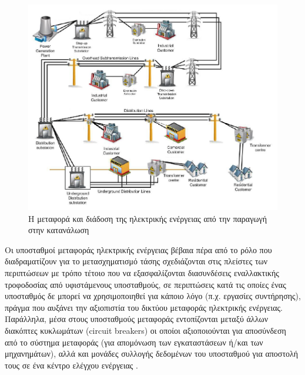 \documentclass[12pt, a4paper, oneside]{report}
\begin{document}
\begin{figure}[!h]
\centering
\includegraphics[scale=0.496]{eikona_00}
\caption[Η μεταφορά και διάδοση της ηλεκτρικής ενέργειας από την παραγωγή στην κατανάλωση]{Η μεταφορά και διάδοση της ηλεκτρικής ενέργειας από την παραγωγή στην κατανάλωση\cite{6}}\label{eik0}
\end{figure}

Οι υποσταθμοί μεταφοράς ηλεκτρικής ενέργειας βέβαια πέρα από το ρόλο που διαδραματίζουν για το μετασχηματισμό τάσης σχεδιάζονται στις πλείστες των περιπτώσεων με τρόπο τέτοιο που να εξασφαλίζονται διασυνδέσεις εναλλακτικής τροφοδοσίας από υφιστάμενους υποσταθμούς, σε περιπτώσεις κατά τις οποίες ένας υποσταθμός δε μπορεί να χρησιμοποιηθεί για κάποιο λόγο (π.χ. εργασίες συντήρησης), πράγμα που αυξάνει την αξιοπιστία του δικτύου μεταφοράς ηλεκτρικής ενέργειας. Παράλληλα, μέσα στους υποσταθμούς μεταφοράς εντοπίζονται μεταξύ άλλων διακόπτες κυκλωμάτων (circuit breakers) οι οποίοι αξιοποιούνται για αποσύνδεση από το σύστημα μεταφοράς (για απομόνωση των εγκαταστάσεων ή\slash και των μηχανημάτων), αλλά και μονάδες συλλογής δεδομένων του υποσταθμού για αποστολή τους σε ένα κέντρο ελέγχου ενέργειας \cite{9}.
\end{document}
